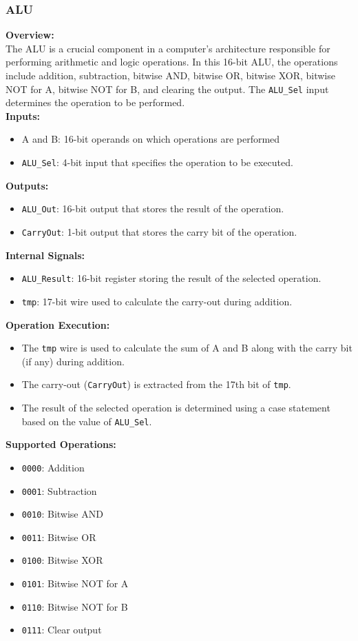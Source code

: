 \documentclass[12pt]{article}
\begin{document}
\subsubsection{ALU}
\textbf{Overview:}\\
The ALU is a crucial component in a computer's architecture responsible for performing arithmetic and logic operations.
In this 16-bit ALU, the operations include addition, subtraction, bitwise AND, bitwise OR, bitwise XOR, bitwise NOT for A,
bitwise NOT for B, and clearing the output. The \verb|ALU_Sel| input determines the operation to be performed.\\
\textbf{Inputs:}
\begin{itemize}
    \item A and B: 16-bit operands on which operations are performed
    \item \verb|ALU_Sel|: 4-bit input that specifies the operation to be executed.
\end{itemize}
\textbf{Outputs:}
\begin{itemize}
    \item \verb|ALU_Out|: 16-bit output that stores the result of the operation.
    \item \verb|CarryOut|: 1-bit output that stores the carry bit of the operation.
\end{itemize}
\textbf{Internal Signals:}
\begin{itemize}
    \item \verb|ALU_Result|: 16-bit register storing the result of the selected operation.
    \item \verb|tmp|: 17-bit wire used to calculate the carry-out during addition.
\end{itemize}
\textbf{Operation Execution:}
\begin{itemize}
    \item The \verb|tmp| wire is used to calculate the sum of A and B along with the carry bit (if any) during addition.
    \item The carry-out (\verb|CarryOut|) is extracted from the 17th bit of \verb|tmp|.
    \item The result of the selected operation is determined using a case statement based on the value of \verb|ALU_Sel|.
\end{itemize}
\textbf{Supported Operations:}
\begin{itemize}
    \item \verb|0000|: Addition
    \item \verb|0001|: Subtraction
    \item \verb|0010|: Bitwise AND
    \item \verb|0011|: Bitwise OR
    \item \verb|0100|: Bitwise XOR
    \item \verb|0101|: Bitwise NOT for A
    \item \verb|0110|: Bitwise NOT for B
    \item \verb|0111|: Clear output
\end{itemize}
\end{document}
